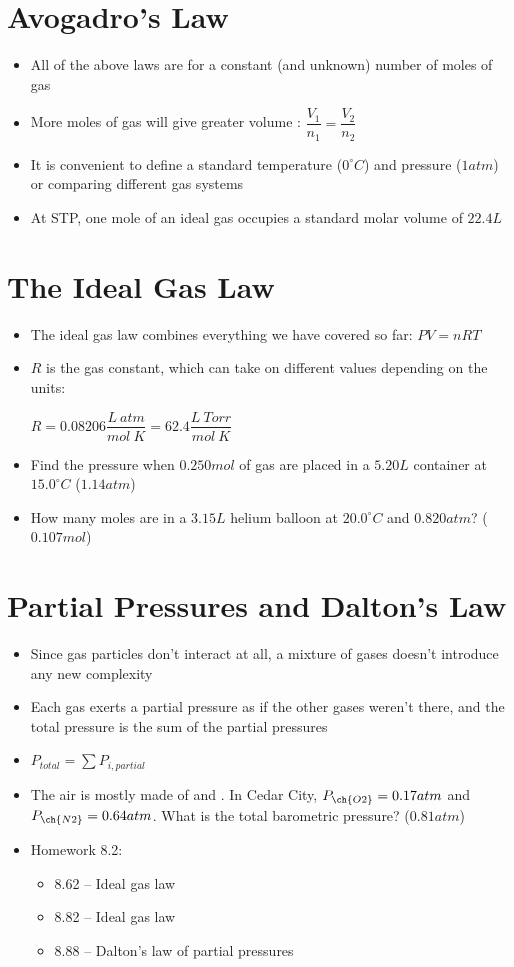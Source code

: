 \documentclass[12pt, openany, letterpaper]{memoir}
\begin{document}
\section{Avogadro's Law}
\begin{itemize}
	\item All of the above laws are for a constant (and unknown) number of moles of gas
	\item More moles of gas will give greater volume : $\dfrac{V_1}{n_1} = \dfrac{V_2}{n_2}$
	\item It is convenient to define a standard temperature ($0^\circ C$) and pressure ($1atm$) or comparing different gas systems
	\item At STP, one mole of an ideal gas occupies a standard molar volume of $22.4L$	
\end{itemize}
\section{The Ideal Gas Law}
\begin{itemize}
	\item The ideal gas law combines everything we have covered so far: $PV=nRT$
	\item $R$ is the gas constant, which can take on different values depending on the units:
	
	$R=0.08206\dfrac{L~atm}{mol~K} = 62.4\dfrac{L~Torr}{mol~K}$
	\item Find the pressure when $0.250mol$ of gas are placed in a $5.20L$ container at $15.0^\circ C$ ($1.14atm$)
	\item How many moles are in a $3.15L$ helium balloon at $20.0^\circ C$ and $0.820atm$? ($0.107mol$)
\end{itemize}
\section{Partial Pressures and Dalton's Law}
\begin{itemize}
	\item Since gas particles don't interact at all, a mixture of gases doesn't introduce any new complexity
	\item Each gas exerts a partial pressure as if the other gases weren't there, and the total pressure is the sum of the partial pressures
	\item $P_{total} = \sum P_{i, partial}$
	\item The air is mostly made of  and . In Cedar City, $P_{\ch{O2}}=0.17atm$ and $P_{\ch{N2}}=0.64atm$. What is the total barometric pressure? ($0.81atm$)
	\item Homework 8.2:
	\begin{itemize}
		\item 8.62 -- Ideal gas law
		\item 8.82 -- Ideal gas law
		\item 8.88 -- Dalton's law of partial pressures
	\end{itemize}
\end{itemize}
\end{document}
